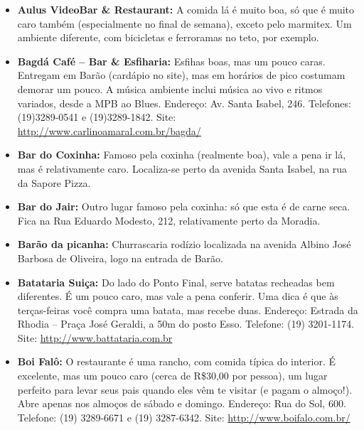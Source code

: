 \begin{itemize}
\item  \textbf{Aulus VideoBar \& Restaurant:} A comida lá é muito boa, só que é muito caro também (especialmente no final de semana), exceto pelo marmitex. Um ambiente diferente, com bicicletas e ferroramas no teto, por exemplo.
\end{itemize}

\begin{itemize}
\item  \textbf{Bagdá Café -- Bar \& Esfiharia:} Esfihas boas, mas um pouco caras. Entregam em Barão (cardápio no site), mas em horários de pico costumam demorar um pouco. A música ambiente inclui música ao vivo e ritmos variados, desde a MPB ao Blues. Endereço: Av. Santa Isabel, 246. Telefones: (19)3289-0541 e (19)3289-1842. Site: \url{http://www.carlinoamaral.com.br/bagda/}
\end{itemize}

\begin{itemize}
\item  \textbf{Bar do Coxinha:} Famoso pela coxinha (realmente boa), vale a pena ir lá, mas é relativamente caro. Localiza-se perto da avenida Santa Isabel, na rua da Sapore Pizza.
\end{itemize}

\begin{itemize}
\item  \textbf{Bar do Jair:} Outro lugar famoso pela coxinha: só que esta é de carne seca. Fica na Rua Eduardo Modesto, 212, relativamente perto da Moradia.
\end{itemize}

\begin{itemize}
\item  \textbf{Barão da picanha:} Churrascaria rodízio localizada na avenida Albino José Barbosa de Oliveira, logo na entrada de Barão.
\end{itemize}

\begin{itemize}
\item  \textbf{Batataria Suiça:} Do lado do Ponto Final, serve batatas recheadas bem diferentes. É um pouco caro, mas vale a pena conferir. Uma dica é que às terças-feiras você compra uma batata, mas recebe duas. Endereço: Estrada da Rhodia -- Praça José Geraldi, a 50m do posto Esso. Telefone: (19) 3201-1174. Site: \url{http://www.battataria.com.br}
\end{itemize}

\begin{itemize}
\item  \textbf{Boi Falô:} O restaurante é uma rancho, com comida típica do interior. É excelente, mas um pouco caro (cerca de R\$30,00 por pessoa), um lugar perfeito para levar seus pais quando eles vêm te visitar (e pagam o almoço!). Abre apenas nos almoços de sábado e domingo. Endereço: Rua do Sol, 600. Telefone: (19) 3289-6671 e (19) 3287-6342. Site: \url{http://www.boifalo.com.br/}
\end{itemize}

